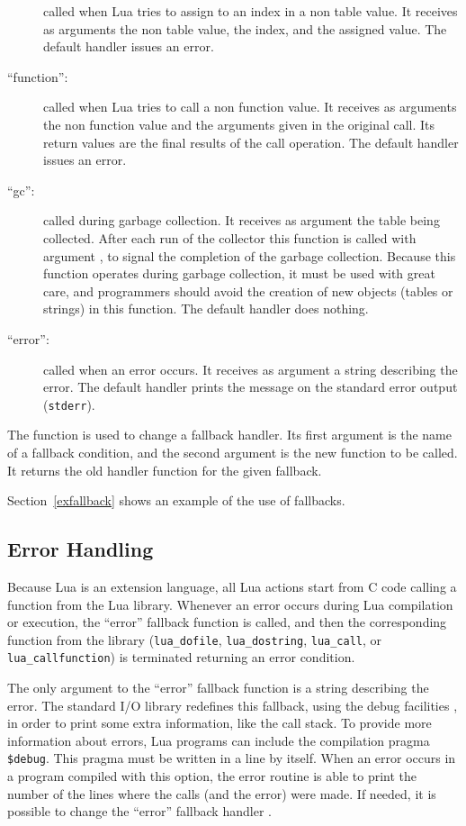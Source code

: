 \begin{description}
called when Lua tries to assign to an index in a non table value.
It receives as arguments the non table value,
the index, and the assigned value.
The default handler issues an error.
\item[``function'':]
called when Lua tries to call a non function value.
It receives as arguments the non function value and the
arguments given in the original call.
Its return values are the final results of the call operation.
The default handler issues an error.
\item[``gc'':]
called during garbage collection.
It receives as argument the table being collected.
After each run of the collector this function is called with argument \nil,
to signal the completion of the garbage collection.
Because this function operates during garbage collection,
it must be used with great care,
and programmers should avoid the creation of new objects
(tables or strings) in this function.
The default handler does nothing.
\item[``error'':]
called when an error occurs.
It receives as argument a string describing the error.
The default handler prints the message on the standard error output
(\verb|stderr|).
\end{description}

The function  is used to change a fallback handler.
Its first argument is the name of a fallback condition,
and the second argument is the new function to be called.
It returns the old handler function for the given fallback.

Section~\ref{exfallback} shows an example of the use of fallbacks.


\subsection{Error Handling} \label{error}

Because Lua is an extension language,
all Lua actions start from C code calling a function from the Lua library.
Whenever an error occurs during Lua compilation or execution,
the ``error'' fallback function is called,
and then the corresponding function from the library
(\verb'lua_dofile', \verb'lua_dostring',
\verb'lua_call', or \verb'lua_callfunction')
is terminated returning an error condition.

The only argument to the ``error'' fallback function is a string
describing the error.
The standard I/O library redefines this fallback,
using the debug facilities ,
in order to print some extra information,
like the call stack.
To provide more information about errors,
Lua programs can include the compilation pragma \verb'$debug'.
\label{pragma}
This pragma must be written in a line by itself.
When an error occurs in a program compiled with this option,
the error routine is able to print the number of the lines where the calls
(and the error) were made.
If needed, it is possible to change the ``error'' fallback handler
.

